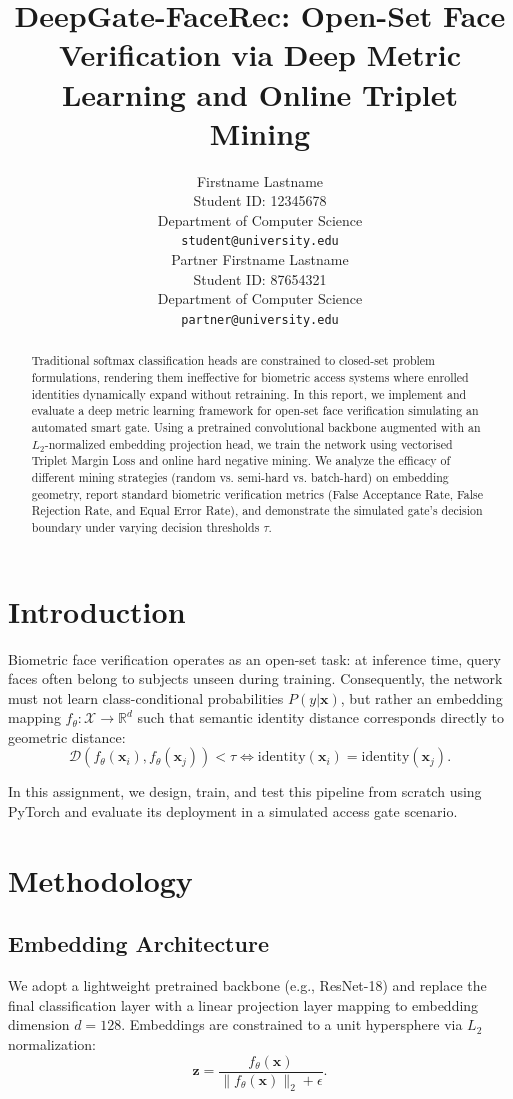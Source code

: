 \documentclass{article}
\title{DeepGate-FaceRec: Open-Set Face Verification via Deep Metric Learning and Online Triplet Mining}
\author{%
  Firstname Lastname \\
  Student ID: 12345678 \\
  Department of Computer Science \\
  \texttt{student@university.edu} \\
  \And
  Partner Firstname Lastname \\
  Student ID: 87654321 \\
  Department of Computer Science \\
  \texttt{partner@university.edu} \\
}
\begin{document}
\maketitle

\begin{abstract}
Traditional softmax classification heads are constrained to closed-set problem formulations, rendering them ineffective for biometric access systems where enrolled identities dynamically expand without retraining. In this report, we implement and evaluate a deep metric learning framework for open-set face verification simulating an automated smart gate. Using a pretrained convolutional backbone augmented with an $L_2$-normalized embedding projection head, we train the network using vectorised Triplet Margin Loss and online hard negative mining. We analyze the efficacy of different mining strategies (random vs. semi-hard vs. batch-hard) on embedding geometry, report standard biometric verification metrics (False Acceptance Rate, False Rejection Rate, and Equal Error Rate), and demonstrate the simulated gate's decision boundary under varying decision thresholds $\tau$.
\end{abstract}

\section{Introduction}
\label{sec:intro}
Biometric face verification operates as an open-set task: at inference time, query faces often belong to subjects unseen during training. Consequently, the network must not learn class-conditional probabilities $P(y|\mathbf{x})$, but rather an embedding mapping $f_\theta: \mathcal{X} \to \mathbb{R}^d$ such that semantic identity distance corresponds directly to geometric distance:
\begin{equation}
    \mathcal{D}(f_\theta(\mathbf{x}_i), f_\theta(\mathbf{x}_j)) < \tau \iff \text{identity}(\mathbf{x}_i) = \text{identity}(\mathbf{x}_j).
\end{equation}

In this assignment, we design, train, and test this pipeline from scratch using PyTorch and evaluate its deployment in a simulated access gate scenario.

\section{Methodology}
\label{sec:methodology}

\subsection{Embedding Architecture}
We adopt a lightweight pretrained backbone (e.g., ResNet-18) and replace the final classification layer with a linear projection layer mapping to embedding dimension $d=128$. Embeddings are constrained to a unit hypersphere via $L_2$ normalization:
\begin{equation}
    \mathbf{z} = \frac{f_\theta(\mathbf{x})}{\|f_\theta(\mathbf{x})\|_2 + \epsilon}.
\end{equation}
\end{document}
